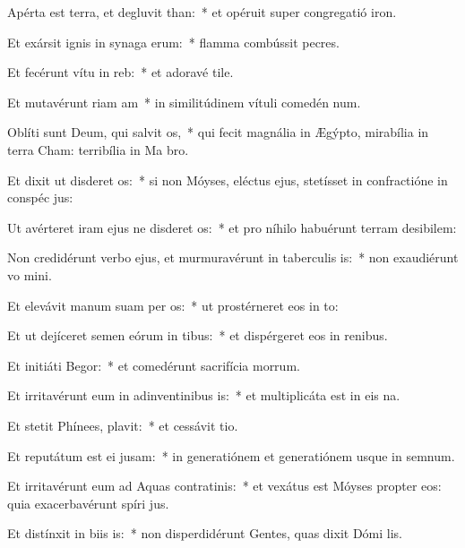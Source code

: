 \item Apérta est terra, et degluvit than:~* et opéruit super congregatió iron.
\item Et exársit ignis in synaga erum:~* flamma combússit pecres.
\item Et fecérunt vítu in reb:~* et adoravé tile.
\item Et mutavérunt riam am~* in similitúdinem vítuli comedén num.
\item Oblíti sunt Deum, qui salvit os,~* qui fecit magnália in Ægýpto, mirabília in terra Cham: terribília in Ma bro.
\item Et dixit ut disderet os:~* si non Móyses, eléctus ejus, stetísset in confractióne in conspéc jus:
\item Ut avérteret iram ejus ne disderet os:~* et pro níhilo habuérunt terram desibilem:
\item Non credidérunt verbo ejus, et murmuravérunt in taberculis is:~* non exaudiérunt vo mini.
\item Et elevávit manum suam per os:~* ut prostérneret eos in to:
\item Et ut dejíceret semen eórum in tibus:~* et dispérgeret eos in renibus.
\item Et initiáti  Begor:~* et comedérunt sacrifícia morrum.
\item Et irritavérunt eum in adinventinibus is:~* et multiplicáta est in eis na.
\item Et stetit Phínees,  plavit:~* et cessávit tio.
\item Et reputátum est ei  jusam:~* in generatiónem et generatiónem usque in semnum.
\item Et irritavérunt eum ad Aquas contratinis:~* et vexátus est Móyses propter eos: quia exacerbavérunt spíri jus.
\item Et distínxit in biis is:~* non disperdidérunt Gentes, quas dixit Dómi lis.
